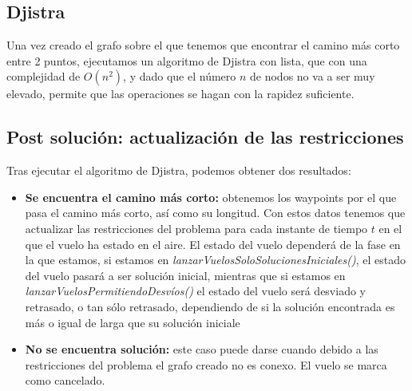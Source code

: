 \subsection{Djistra}
Una vez creado el grafo sobre el que tenemos que encontrar el camino más corto entre 2 puntos, ejecutamos un algoritmo de Djistra con lista, que con una complejidad de $O(n^{2})$, y dado que el número $n$ de nodos no va a ser muy elevado, permite que las operaciones se hagan con la rapidez suficiente.
\subsection{Post solución: actualización de las restricciones}
Tras ejecutar el algoritmo de Djistra, podemos obtener dos resultados:
\begin{itemize}
	\item \textbf{Se encuentra el camino más corto:} obtenemos los waypoints por el que pasa el camino más corto, así como su longitud. Con estos datos tenemos que actualizar las restricciones del problema para cada instante de tiempo $t$ en el que el vuelo ha estado en el aire. El estado del vuelo dependerá de la fase en la que estamos, si estamos en \textit{lanzarVuelosSoloSolucionesIniciales()}, el estado del vuelo pasará a ser solución inicial, mientras que si estamos en \textit{lanzarVuelosPermitiendoDesvíos()} el estado del vuelo será desviado y retrasado, o tan sólo retrasado, dependiendo de si la solución encontrada es más o igual de larga que su solución iniciale
	\item \textbf{No se encuentra solución:} este caso puede darse cuando debido a las restricciones del problema el grafo creado no es conexo. El vuelo se marca como cancelado.
\end{itemize}
